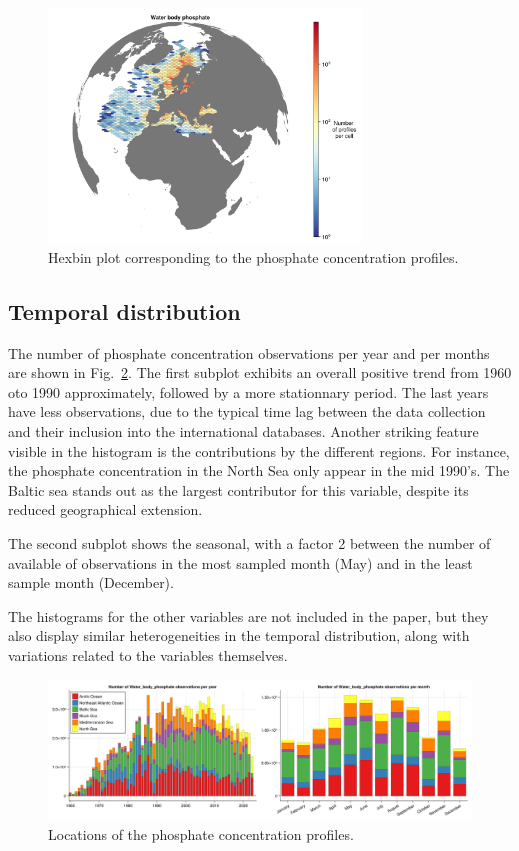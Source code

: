 \documentclass[essd, manuscript]{copernicus}
\begin{document}
\begin{figure}[t]
\includegraphics[width=8.3cm]{observations_Water_body_phosphate_hex.png}
\caption{Hexbin plot corresponding to the phosphate concentration profiles.\label{fig:phosphatedatahexbin}}
\end{figure}

\subsection{Temporal distribution}

The number of phosphate concentration observations per year and per months are shown in Fig.~\ref{fig:phosphatetime}. The first subplot exhibits an overall positive trend from 1960 oto 1990 approximately, followed by a more stationnary period. The last years have less observations, due to the typical time lag between the data collection and their inclusion into the international databases. Another striking feature visible in the histogram is the contributions by the different regions. For instance, the phosphate concentration in the North Sea only appear in the mid 1990's. The Baltic sea stands out as the largest contributor for this variable, despite its reduced geographical extension.

The second subplot shows the seasonal, with a factor 2 between the number of available of observations in the most sampled month (May) and in the least sample month (December). 

The histograms for the other variables are not included in the paper, but they also display similar heterogeneities in the temporal distribution, along with variations related to the variables themselves. 

\begin{figure}[t]
\centering
\includegraphics[width=\textwidth]{stacked_histogram_Water_body_phosphate.png}
\caption{Locations of the phosphate concentration profiles.\label{fig:phosphatetime}}
\end{figure}
\end{document}
